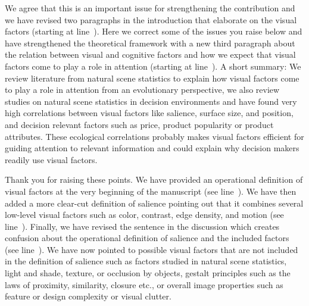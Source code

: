 
We agree that this is an important issue for strengthening the contribution and we have revised two paragraphs in the introduction that elaborate on the visual factors (starting at line~). Here we correct some of the issues you raise below and have strengthened the theoretical framework with a new third paragraph about the relation between visual and cognitive factors and how we expect that visual factors come to play a role in attention (starting at line~). A short summary: We review literature from natural scene statistics to explain how visual factors come to play a role in attention from an evolutionary perspective, we also review studies on natural scene statistics in decision environments and have found very high correlations between visual factors like salience, surface size, and position, and decision relevant factors such as price, product popularity or product attributes. These ecological correlations probably makes visual factors efficient for guiding attention to relevant information and could explain why decision makers readily use visual factors.   



Thank you for raising these points. We have provided an operational definition of visual factors at the very beginning of the manuscript (see line~). We have then added a more clear-cut definition of salience pointing out that it combines several low-level visual factors such as color, contrast, edge density, and motion (see line~). Finally, we have revised the sentence in the discussion which creates confusion about the operational definition of salience and the included factors (see line~). We have now pointed to possible visual factors that are not included in the definition of salience such as factors studied in natural scene statistics, light and shade, texture, or occlusion by objects, gestalt principles such as the laws of proximity, similarity, closure etc., or overall image properties such as feature or design complexity or visual clutter. 


